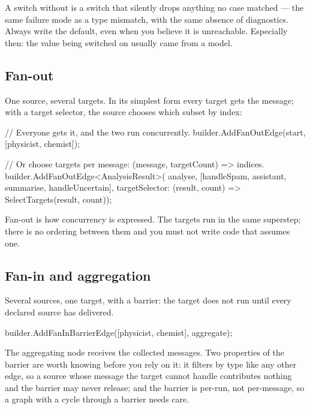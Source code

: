 \begin{warning}
A switch without  is a switch that silently drops anything no
case matched --- the same failure mode as a type mismatch, with the same absence
of diagnostics. Always write the default, even when you believe it is
unreachable. Especially then: the value being switched on usually came from a
model.
\end{warning}

\subsection{Fan-out}

One source, several targets. In its simplest form every target gets the message;
with a target selector, the source chooses which subset by index:

\begin{csharp}[caption={Fan-out, unconditional and selective}, label={lst:wf-edge-fanout}]
// Everyone gets it, and the two run concurrently.
builder.AddFanOutEdge(start, [physicist, chemist]);

// Or choose targets per message: (message, targetCount) => indices.
builder.AddFanOutEdge<AnalysisResult>(
    analyse,
    [handleSpam, assistant, summarise, handleUncertain],
    targetSelector: (result, count) => SelectTargets(result, count));
\end{csharp}

Fan-out is how concurrency is expressed. The targets run in the same superstep;
there is no ordering between them and you must not write code that assumes one.

\subsection{Fan-in and aggregation}

Several sources, one target, with a barrier: the target does not run until every
declared source has delivered.

\begin{csharp}[caption={A barrier join}, label={lst:wf-edge-fanin}]
builder.AddFanInBarrierEdge([physicist, chemist], aggregate);
\end{csharp}

The aggregating node receives the collected messages. Two properties of the
barrier are worth knowing before you rely on it: it filters by type like any
other edge, so a source whose message the target cannot handle contributes
nothing and the barrier may never release; and the barrier is per-run, not
per-message, so a graph with a cycle through a barrier needs care.

